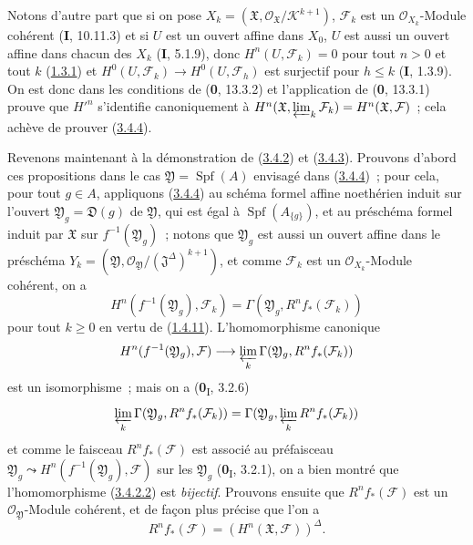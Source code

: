 Notons d'autre part que si on pose
$X_k=(\mathfrak X,\mathcal O_{\mathfrak X}/\mathcal K^{k+1})$,
$\mathcal F_k$ est un $\mathcal O_{X_k}$-Module cohérent (\textbf{I}, 10.11.3) et si
$U$ est un ouvert affine dans $X_0$, $U$ est aussi un ouvert affine dans
chacun des $X_k$ (\textbf{I}, 5.1.9), donc $H^n(U,\mathcal F_k)=0$ pour tout $n>0$ et
tout $k$ (\hyperref[III.1.3.1-fr]{1.3.1}) et
$H^0(U,\mathcal F_k)\to H^0(U,\mathcal F_h)$ est surjectif pour $h\leq k$
(\textbf{I}, 1.3.9). On est donc dans les conditions de (\textbf{0}, 13.3.2) et l'application
de (\textbf{0}, 13.3.1) prouve que $H'^{n}$ s'identifie canoniquement à
$H^n(\mathfrak X,\varprojlim_k\mathcal F_k)=H^n(\mathfrak X,\mathcal F)$~;
cela achève de prouver (\hyperref[III.3.4.4-fr]{3.4.4}).

\begin{env}[3.4.5]
\label{III.3.4.5-fr}
Revenons maintenant à la démonstration de (\hyperref[III.3.4.2-fr]{3.4.2})
et (\hyperref[III.3.4.3-fr]{3.4.3}). Prouvons d'abord ces propositions dans
le cas $\mathfrak Y=\operatorname{Spf}(A)$ envisagé dans
(\hyperref[III.3.4.4-fr]{3.4.4})~; pour cela, pour tout $g\in A$, appliquons
(\hyperref[III.3.4.4-fr]{3.4.4}) au schéma formel affine noethérien induit
sur l'ouvert $\mathfrak Y_g=\mathfrak D(g)$ de $\mathfrak Y$, qui est égal à
$\operatorname{Spf}(A_{\{g\}})$, et au préschéma formel induit par
$\mathfrak X$ sur $f^{-1}(\mathfrak Y_g)$~; notons que $\mathfrak Y_g$ est
aussi un ouvert affine dans le préschéma
$Y_k=(\mathfrak Y,\mathcal O_{\mathfrak Y}/(\mathfrak J^\Delta)^{k+1})$,
et comme $\mathcal F_k$ est un $\mathcal O_{X_k}$-Module cohérent, on a
\[
H^n(f^{-1}(\mathfrak Y_g),\mathcal F_k)
=\Gamma(\mathfrak Y_g,R^nf_*(\mathcal F_k))
\]
pour tout $k\geq0$ en vertu de
(\hyperref[III.1.4.11-fr]{1.4.11}). L'homomorphisme canonique
\[
H^n(f^{-1}(\mathfrak Y_g),\mathcal F)
\longrightarrow\varprojlim_k\Gamma(\mathfrak Y_g,R^nf_*(\mathcal F_k))
\]
est un isomorphisme~; mais on a (\textbf{0}\textsubscript{I}, 3.2.6)
\[
\varprojlim_k\Gamma(\mathfrak Y_g,R^nf_*(\mathcal F_k))
=\Gamma(\mathfrak Y_g,\varprojlim_kR^nf_*(\mathcal F_k))
\]
et comme le faisceau $R^nf_*(\mathcal F)$ est associé au préfaisceau
$\mathfrak Y_g\leadsto H^n(f^{-1}(\mathfrak Y_g),\mathcal F)$ sur les
$\mathfrak Y_g$ (\textbf{0}\textsubscript{I}, 3.2.1), on a bien montré que
l'homomorphisme (\hyperref[III.3.4.2.2-fr]{3.4.2.2}) est \emph{bijectif}. Prouvons
ensuite que $R^nf_*(\mathcal F)$ est un $\mathcal O_{\mathfrak Y}$-Module
cohérent, et de façon plus précise que l'on a
\[
R^nf_*(\mathcal F)=(H^n(\mathfrak X,\mathcal F))^\Delta.
\tag{3.4.5.1}\label{III.3.4.5.1-fr}
\]


\end{env}
